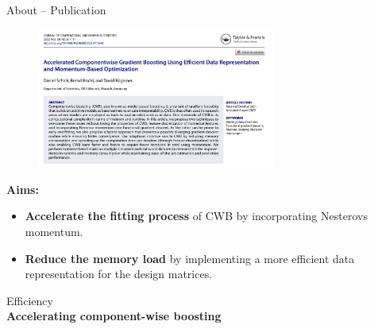 \documentclass[10pt]{beamer}
\begin{document}
\begin{frame}{About -- Publication}

  \vspace{-0.2cm}
  \begin{figure}
    \centering
    \includegraphics[width=0.7\textwidth]{figures/fig-cacb-paper.png}
  \end{figure}
  \vspace{-0.4cm}

  \textbf{Aims:}
  \begin{itemize}
    \item
      \textbf{Accelerate the fitting process} of CWB by incorporating Nesterovs momentum.
    \item
      \textbf{Reduce the memory load} by implementing a more efficient data representation for the design matrices.
  \end{itemize}

\end{frame}

\begin{frame}[plain]{}
  \Large Efficiency\\[0.3cm]
  {\LARGE\textbf{Accelerating component-wise boosting}}
\end{frame}
\end{document}
